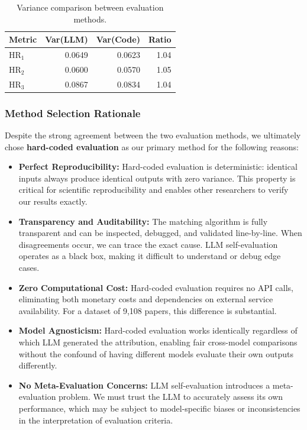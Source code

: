 \documentclass[11pt]{article}
\begin{document}
\begin{table}[htbp]
  \centering
  \normalsize

  \begin{tabular}{@{}lrrr@{}}
    \toprule
    \textbf{Metric} & \textbf{Var(LLM)} & \textbf{Var(Code)} & \textbf{Ratio} \\
    \midrule
    HR$_1$   & 0.0649 & 0.0623 & 1.04 \\
    HR$_2$     & 0.0600 & 0.0570 & 1.05 \\
    HR$_3$     & 0.0867 & 0.0834 & 1.04 \\
    \bottomrule
  \end{tabular}
    \caption{Variance comparison between evaluation methods.}
  \label{tab:variance_comparison}
\end{table}

\subsubsection{Method Selection Rationale}

Despite the strong agreement between the two evaluation methods, we ultimately chose \textbf{hard-coded evaluation} as our primary method for the following reasons:

\begin{itemize}[
   leftmargin=1em,
    itemsep=0.2em,
    topsep=0.2em,
    partopsep=0em,
    parsep=0em
]
\item \textbf{Perfect Reproducibility:} Hard-coded evaluation is deterministic: identical inputs always produce identical outputs with zero variance. This property is critical for scientific reproducibility and enables other researchers to verify our results exactly.

\item \textbf{Transparency and Auditability:} The matching algorithm is fully transparent and can be inspected, debugged, and validated line-by-line. When disagreements occur, we can trace the exact cause. LLM self-evaluation operates as a black box, making it difficult to understand or debug edge cases.

\item \textbf{Zero Computational Cost:} Hard-coded evaluation requires no API calls, eliminating both monetary costs and dependencies on external service availability. For a dataset of 9,108 papers, this difference is substantial.

\item \textbf{Model Agnosticism:} Hard-coded evaluation works identically regardless of which LLM generated the attribution, enabling fair cross-model comparisons without the confound of having different models evaluate their own outputs differently.

\item \textbf{No Meta-Evaluation Concerns:} LLM self-evaluation introduces a meta-evaluation problem. We must trust the LLM to accurately assess its own performance, which may be subject to model-specific biases or inconsistencies in the interpretation of evaluation criteria.
\end{itemize}
\end{document}
